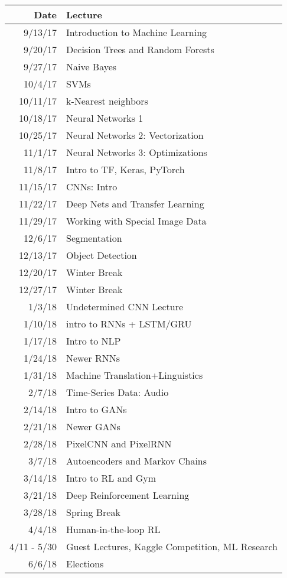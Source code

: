 \documentclass{article}
\begin{document}
\begin{tabular}{|r|l| }
  \hline
\textbf{Date} & \textbf{Lecture} \\
  \hline
9/13/17 & Introduction to Machine Learning \\ 
9/20/17 & Decision Trees and Random Forests \\ 
9/27/17 & Naive Bayes \\ 
10/4/17 & SVMs \\ 
10/11/17 & k-Nearest neighbors \\ 
10/18/17 & Neural Networks 1 \\ 
10/25/17 & Neural Networks 2: Vectorization \\ 
11/1/17 & Neural Networks 3: Optimizations \\ 
11/8/17 & Intro to TF, Keras, PyTorch \\ 
11/15/17 & CNNs: Intro \\ 
11/22/17 & Deep Nets and Transfer Learning \\ 
11/29/17 & Working with Special Image Data \\ 
12/6/17 & Segmentation \\ 
12/13/17 & Object Detection \\ 
12/20/17 & Winter Break \\ 
12/27/17 & Winter Break \\ 
1/3/18 & Undetermined CNN Lecture \\ 
1/10/18 & intro to RNNs + LSTM/GRU \\ 
1/17/18 & Intro to NLP \\ 
1/24/18 &Newer RNNs \\ 
1/31/18 &Machine Translation+Linguistics \\ 
2/7/18 &Time-Series Data: Audio \\ 
2/14/18 &Intro to GANs \\ 
2/21/18 &Newer GANs \\ 
2/28/18 & PixelCNN and PixelRNN \\ 
3/7/18 & Autoencoders and Markov Chains \\ 
3/14/18 & Intro to RL and Gym \\ 
3/21/18 & Deep Reinforcement Learning \\ 
3/28/18 & Spring Break \\ 
4/4/18 & Human-in-the-loop RL \\ 
4/11 - 5/30 & Guest Lectures, Kaggle Competition, ML Research \\ 
6/6/18 & Elections \\
  \hline
\end{tabular}
\end{document}
